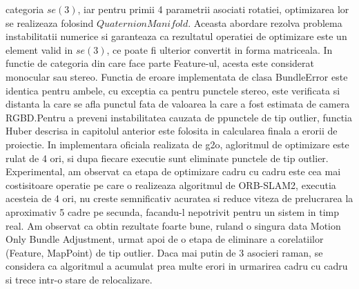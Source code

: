 \documentclass[12pt,a4paper]{report}
\begin{document}
categoria $ se(3) $, iar pentru primii 4 parametrii asociati rotatiei, optimizarea lor se realizeaza
folosind $ QuaternionManifold $. Aceasta abordare rezolva problema instabilitatii numerice si 
garanteaza ca rezultatul operatiei de optimizare este un element valid in $ se(3) $, ce poate fi 
ulterior convertit in forma matriceala. In functie de categoria din care face parte Feature-ul, 
acesta este considerat monocular sau stereo. Functia de eroare implementata de clasa BundleError 
este identica pentru ambele, cu exceptia ca pentru punctele stereo, este verificata si distanta 
la care se afla punctul fata de valoarea la care a fost estimata de camera RGBD.\@ Pentru a preveni
instabilitatea cauzata de ppunctele de tip outlier, functia Huber descrisa in capitolul anterior este
folosita in calcularea finala a erorii de proiectie. In implementara oficiala realizata de g2o, 
agloritmul de optimizare este rulat de 4 ori, si dupa fiecare executie sunt eliminate punctele de tip 
outlier. Experimental, am observat ca etapa de optimizare cadru cu cadru este cea mai costisitoare 
operatie pe care o realizeaza algoritmul de ORB-SLAM2, executia acesteia de 4 ori, nu creste 
semnificativ acuratea si reduce viteza de prelucrarea la aproximativ 5 cadre pe secunda, facandu-l 
nepotrivit pentru un sistem in timp real. Am observat ca obtin rezultate foarte bune, ruland o singura
data Motion Only Bundle Adjustment, urmat apoi de o etapa de eliminare a corelatiilor 
(Feature, MapPoint) de tip outlier. Daca mai putin de 3 asocieri raman, se considera ca algoritmul
a acumulat prea multe erori in urmarirea cadru cu cadru si trece intr-o stare de relocalizare.
\end{document}

